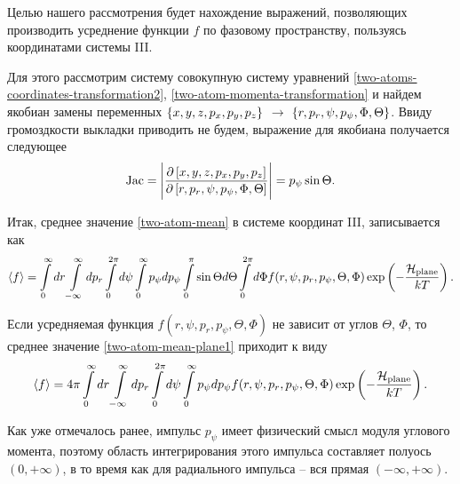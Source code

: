 Целью нашего рассмотрения будет нахождение выражений, позволяющих производить усреднение функции $f$ по фазовому пространству, пользуясь координатами системы III. \par
Для этого рассмотрим систему совокупную систему уравнений \eqref{two-atoms-coordinates-transformation2}, \eqref{two-atom-momenta-transformation} и найдем якобиан замены переменных $\left\{ x, y, z, p_x, p_y, p_z \right\}$ $\rightarrow$ $\left\{ r, p_r, \psi, p_\psi, \Phi, \Theta \right\}$. Ввиду громоздкости выкладки приводить не будем, выражение для якобиана получается следующее
\begin{gather}
    \text{Jac} = \Bigg\vert \frac{\partial \left[ x, y, z, p_x, p_y, p_z \right]}{\partial \left[ r, p_r, \psi, p_\psi, \Phi, \Theta \right]} \Bigg\vert = p_\psi \sin \Theta.
\end{gather}

Итак, среднее значение \eqref{two-atom-mean} в системе координат III, записывается как
\begin{gather}
    \langle  f  \rangle = \int\limits_{0}^{\infty} dr \int\limits_{-\infty}^\infty dp_r \int\limits_0^{2\pi} d\psi \int\limits_0^\infty p_\psi dp_\psi \int\limits_0^\pi \sin \Theta d\Theta \int\limits_0^{2\pi} d\Phi f(r, \psi, p_r, p_\psi, \Theta, \Phi) \exp \left( -\frac{\mathcal{H}_\text{plane}}{k T} \right). \label{two-atom-mean-plane1} 
\end{gather}

Если усредняемая функция $f(r, \psi, p_r, p_\psi, \Theta, \Phi)$ не зависит от углов $\Theta$, $\Phi$, то среднее значение  \eqref{two-atom-mean-plane1} приходит к виду
\color{red}{(Привести бы пример со спектральным моментом, как мы это используем)}
\color{black}
\begin{gather}
    \langle  f  \rangle = 4 \pi \int\limits_{0}^{\infty} dr \int\limits_{-\infty}^\infty dp_r \int\limits_0^{2\pi} d\psi \int\limits_0^\infty p_\psi dp_\psi f(r, \psi, p_r, p_\psi, \Theta, \Phi) \exp \left( -\frac{\mathcal{H}_\text{plane}}{k T} \right). \label{two-atom-mean-plane2} 
\end{gather}

Как уже отмечалось ранее, импульс $p_\psi$ имеет физический смысл модуля углового момента, поэтому область интегрирования этого импульса составляет полуось $(0, +\infty)$, в то время как для радиального импульса -- вся прямая $(-\infty, +\infty)$. 
